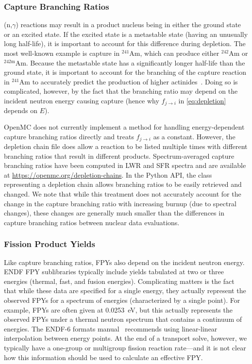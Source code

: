 \documentclass[3p,authoryear]{elsarticle}
\begin{document}
\subsubsection{Capture Branching Ratios}

(n,$\gamma$) reactions may result in a product nucleus being in either the
ground state or an excited state. If the excited state is a metastable state
(having an unusually long half-life), it is important to account for this
difference during depletion. The most well-known example is capture in
$^{241}$Am, which can produce either $^{242}$Am or $^{242\text{m}}$Am. Because
the metastable state has a significantly longer half-life than the ground state,
it is important to account for the branching of the capture reaction in
$^{241}$Am to accurately predict the production of higher
actinides~\citep{haeck2012nse}. Doing so is complicated, however, by the fact
that the branching ratio may depend on the incident neutron energy causing
capture (hence why $f_{j\rightarrow i}$ in \cref{eq:depletion} depends on $E$).

OpenMC does not currently implement a method for handling energy-dependent
capture branching ratios directly and treats $f_{j\rightarrow i}$ as a constant.
However, the depletion chain file does allow a reaction to be listed multiple
times with different branching ratios that result in different products.
Spectrum-averaged capture branching ratios have been computed in LWR and SFR
spectra and are available at \url{https://openmc.org/depletion-chains}. In the
Python API, the class representing a depletion chain allows branching ratios to
be easily retrieved and changed. We note that while this treatment does not
accurately account for the change in the capture branching ratio with increasing
burnup (due to spectral changes), these changes are generally much smaller than
the differences in capture branching ratios between nuclear data evaluations.

\subsubsection{Fission Product Yields}
\label{sec:fpy}

Like capture branching ratios, FPYs also depend on the incident neutron energy.
ENDF FPY sublibraries typically include yields tabulated at two or three
energies (thermal, fast, and fusion energies). Complicating matters is the fact
that while these data are specified for a single energy, they actually represent
the observed FPYs for a spectrum of energies (characterized by a single point).
For example, FPYs are often given at \SI{0.0253}{\electronvolt}, but this
actually represents the observed FPYs under a thermal neutron spectrum that
contains a continuum of energies. The ENDF-6 formats manual~\citep{trkov2018bnl}
recommends using linear-linear interpolation between energy points. At the end
of a transport solve, however, we typically have a one-group or multigroup
fission reaction rate---and it is not clear how this information should be used
to calculate an effective FPY.
\end{document}
